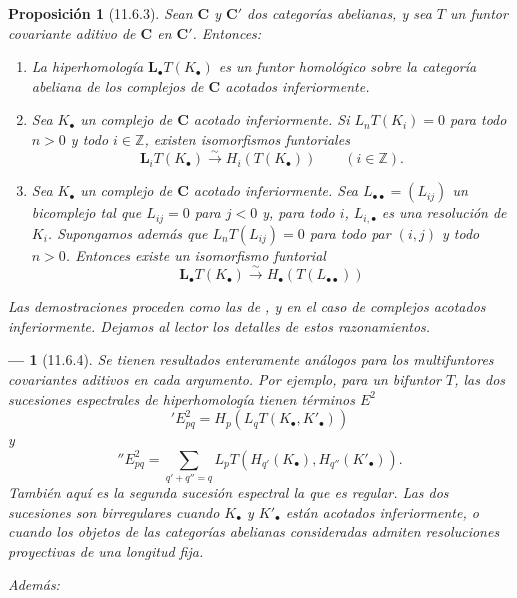 \documentclass[10pt,oneside,openany]{book}
\theoremstyle{egaenv}\newtheorem*{env}{---}
\theoremstyle{egastatement}
\newtheorem*{proposition}{Proposición}
\theoremstyle{egadescription}
\newcommand{\oldpage}[2][]{\marginnote{\normalfont\scriptsize\textbf{#1}\,|\,#2}\ignorespaces}
\begin{document}
\begin{proposition}[11.6.3]
\label{0.11.6.3}
\label{0.11.6.3-fr}
Sean $\boldsymbol{C}$ y $\boldsymbol{C}'$ dos categorías abelianas, y sea $T$ un funtor covariante aditivo de $\boldsymbol{C}$ en $\boldsymbol{C}'$.
Entonces:
\begin{enumerate}
  \item[{\rm(i)}] {La hiperhomología $\mathbf{L}_\bullet T(K_\bullet)$ es un funtor homológico sobre la categoría abeliana de los complejos de $\boldsymbol{C}$ acotados inferiormente.}

  \item[{\rm(ii)}] {Sea $K_\bullet$ un complejo de $\boldsymbol{C}$ acotado inferiormente.
  Si $L_nT(K_i)=0$ para todo $n>0$ y todo $i\in\mathbb Z$, existen isomorfismos funtoriales}
  \[
\label{0.11.6.3.1-fr}
\tag{11.6.3.1}
\mathbf{L}_iT(K_\bullet)\xrightarrow{\sim} H_i(T(K_\bullet))\qquad(i\in\mathbb Z).
\]

  \item[{\rm(iii)}] {Sea $K_\bullet$ un complejo de $\boldsymbol{C}$ acotado inferiormente.
  Sea $L_{\bullet\bullet}=(L_{ij})$ un bicomplejo tal que $L_{ij}=0$ para $j<0$ y, para todo $i$, $L_{i,\bullet}$ es una resolución de $K_i$.
  Supongamos además que $L_nT(L_{ij})=0$ para todo par $(i,j)$ y todo $n>0$.
  Entonces existe un isomorfismo funtorial}
  \[
\label{0.11.6.3.2-fr}
\tag{11.6.3.2}
\mathbf{L}_\bullet T(K_\bullet)\xrightarrow{\sim} H_\bullet(T(L_{\bullet\bullet}))
\]
\end{enumerate}

\upshape Las demostraciones proceden como las de ,  y  en el caso de complejos acotados inferiormente.
Dejamos al lector los detalles de estos razonamientos.
\end{proposition}

\begin{env}[11.6.4]
\label{0.11.6.4}
\label{0.11.6.4-fr}
Se tienen resultados enteramente análogos para los \emph{multifuntores} covariantes aditivos en cada argumento.
Por ejemplo, para un bifuntor $T$, las dos sucesiones espectrales de hiperhomología tienen términos $E^2$
\oldpage[0\textsubscript{III}]{41}
\[
\label{0.11.6.4.1-fr}
\tag{11.6.4.1}
{}'E^2_{pq}=H_p(L_qT(K_\bullet,K'_\bullet))
\]
y
\[
\label{0.11.6.4.2-fr}
\tag{11.6.4.2}
{}''E^2_{pq}=
\sum_{q'+q''=q}L_pT(H_{q'}(K_\bullet),H_{q''}(K'_\bullet)).
\]
También aquí es la \emph{segunda} sucesión espectral la que es regular.
Las dos sucesiones son birregulares cuando $K_\bullet$ y $K'_\bullet$ están acotados inferiormente, o cuando los objetos de las categorías abelianas consideradas admiten resoluciones proyectivas de una longitud fija.

Además:
\end{env}
\end{document}
